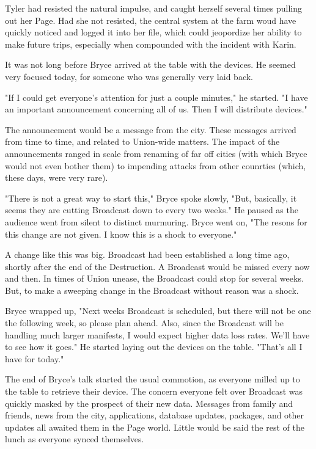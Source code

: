 \documentclass[courier]{sffms}
\begin{document}
Tyler had resisted the natural impulse, and caught herself
several times pulling out her Page. Had she not resisted,
the central system at the farm woud have quickly noticed
and logged it into her file, which could jeopordize her
ability to make future trips, especially when compounded
with the incident with Karin.

It was not long before Bryce arrived at the table with the
devices. He seemed very focused today, for someone
who was generally very laid back. 

"If I could get everyone's attention for just a couple
minutes," he started. "I have an important announcement
concerning all of us. Then I will distribute devices."

The announcement would be a message from the city. These
messages arrived from time to time, and related to Union-wide
matters. The impact of the announcements
ranged in scale from renaming of far off cities (with which Bryce
would not even bother them) to impending attacks from
other counrties (which, these days, were very rare).

"There is not a great way to start this," Bryce spoke slowly,
"But, basically, it seems they are cutting Broadcast down to
every two weeks." He paused as the audience went from 
silent to distinct murmuring. Bryce went on, "The resons for
this change are not given. I know this is a shock to everyone."

A change like this was big. Broadcast had been established
a long time ago, shortly after the end of the Destruction.
A Broadcast would be missed every now and then. In times
of Union unease, the Broadcast could stop for several weeks.
But, to make a sweeping change in the Broadcast without
reason was a shock.

Bryce wrapped up, "Next weeks Broadcast is scheduled,
but there will not be one the following week, so please
plan ahead. Also, since the Broadcast will be handling
much larger manifests, I would expect higher data loss
rates. We'll have to see how it goes." He started laying
out the devices on the table. "That's all I have for today."

The end of Bryce's talk started the usual commotion, as
everyone milled up to the table to retrieve their device.
The concern everyone felt over Broadcast was quickly
masked by the prospect of their new data. Messages
from family and friends, news from the city, applications,
database updates, packages, and other updates all
awaited them in the Page world. Little would be said
the rest of the lunch as everyone synced themselves.
\end{document}
